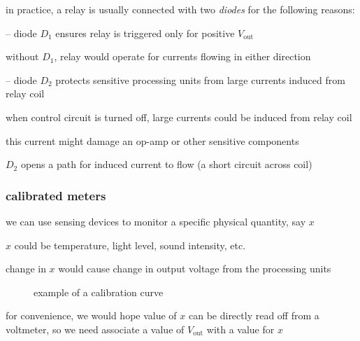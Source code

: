 \cmt in practice, a relay is usually connected with two \emph{diodes} for the following reasons:

\begin{compactitem}
	\item[--] diode $D_1$ ensures relay is triggered only for positive $V_\text{out}$
	
	without $D_1$, relay would operate for currents flowing in either direction
	
	\item[--] diode $D_2$ protects sensitive processing units from large currents induced from relay coil
	
	when control circuit is turned off, large currents could be induced from relay coil
	
	this current might damage an op-amp or other sensitive components
	
	$D_2$ opens a path for induced current to flow (a short circuit across coil)
\end{compactitem}





\subsubsection{calibrated meters}

we can use sensing devices to monitor a specific physical quantity, say $x$

$x$ could be temperature, light level, sound intensity, etc.

change in $x$ would cause change in output voltage from the processing units

\begin{wrapfigure}{r}{0.45\textwidth}
	\centering
	\vspace*{-15pt}
	\caption*{example of a calibration curve}
\end{wrapfigure}

for convenience, we would hope value of $x$ can be directly read off from a voltmeter, so we need associate a value of $V_\text{out}$ with a value for $x$


